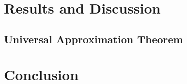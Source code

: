 \documentclass[twoside,11pt]{report}
\begin{document}




\section{Results and Discussion}
\label{sec:resultsdiscussion}



\subsection{ Universal Approximation Theorem }
\label{sec:UAT}







\section{Conclusion}
\label{sec:conclusion}

























\end{document}
